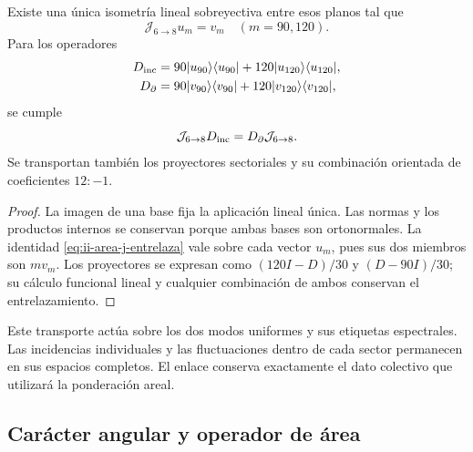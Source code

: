 \begin{theorem}
\label{thm:ii-area-entrelazamiento-colectivo}
Existe una única isometría lineal sobreyectiva entre esos planos tal que
\begin{equation}
 \mathcal J_{6\to8}u_m=v_m\quad(m=90,120).
 \label{eq:ii-area-j-colectivo}
\end{equation}
Para los operadores
\[
 \begin{aligned}
 D_{\rm inc}&=90|u_{90}\rangle\langle u_{90}|
             +120|u_{120}\rangle\langle u_{120}|,\\
 D_\partial&=90|v_{90}\rangle\langle v_{90}|
             +120|v_{120}\rangle\langle v_{120}|,
 \end{aligned}
\]
se cumple
\begin{equation}
 \mathcal J_{6\to8}D_{\rm inc}
 =D_\partial\mathcal J_{6\to8}.
 \label{eq:ii-area-j-entrelaza}
\end{equation}
Se transportan también los proyectores sectoriales y su combinación
orientada de coeficientes \(12:-1\).
\end{theorem}
\begin{proof}
La imagen de una base fija la aplicación lineal única. Las normas y los
productos internos se conservan porque ambas bases son ortonormales.
La identidad \eqref{eq:ii-area-j-entrelaza} vale sobre cada vector
\(u_m\), pues sus dos miembros son \(m v_m\). Los proyectores se
expresan como \((120I-D)/30\) y \((D-90I)/30\); su cálculo funcional
lineal y cualquier combinación de ambos conservan el entrelazamiento.
\end{proof}

Este transporte actúa sobre los dos modos uniformes y sus etiquetas
espectrales. Las incidencias individuales y las fluctuaciones dentro de
cada sector permanecen en sus espacios completos. El enlace conserva
exactamente el dato colectivo que utilizará la ponderación areal.

\subsection{Carácter angular y operador de área}
\label{sec:ii-area-caracter}

